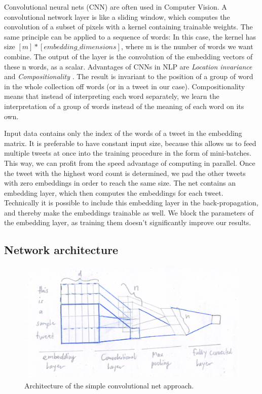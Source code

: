 \documentclass[10pt,conference,compsocconf]{IEEEtran}
\begin{document}
Convolutional neural nets (CNN) are often used in Computer Vision. A convolutional network layer is like a sliding window, which computes the convolution of a subset of pixels with a kernel containing trainable weights. The same principle can be applied to a sequence of words: In this case, the kernel has size $[m] * [embedding\_dimensions] $, where m is the number of words we want combine. The output of the layer is the convolution of the embedding vectors of these n words, as a scalar. Advantages of CNNs in NLP are \textit{Location invariance} and \textit{Compositionality} \cite{britz_2016}. The result is invariant to the position of a group of word in the whole collection off words (or in a tweet in our case). Compositionality means that instead of interpreting each word separately, we learn the interpretation of a group of words instead of the meaning of each word on its own. 

 Input data contains only the index of the words of a tweet in the embedding matrix. It is preferable to have constant input size, because this allows us to feed multiple tweets at once into the training procedure in the form of mini-batches. This way, we can profit from the speed advantage of computing in parallel. Once the tweet with the highest word count is determined, we pad the other tweets with zero embeddings in order to reach the same size. The net contains an embedding layer, which then computes the embeddings for each tweet. Technically it is possible to include this embedding layer in the back-propagation, and thereby make the embeddings trainable as well. We block the parameters of the embedding layer, as training them doesn't significantly improve our results.
 
 \subsection{Network architecture}
 
 \begin{figure}[H]
  \centering
  \includegraphics[width=\columnwidth]{network_architecture.png}
  \caption{Architecture of the simple convolutional net approach.}
  \vspace{-3mm}
  \label{fig:network_architecture}
\end{figure}
\end{document}
